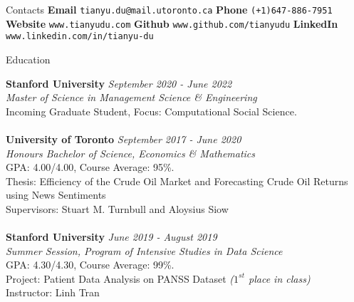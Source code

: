 \documentclass{resume} %
\begin{document}

\begin{rSection}{Contacts}
	\textbf{Email} \texttt{tianyu.du@mail.utoronto.ca}
	\quad
	\textbf{Phone} \texttt{(+1)647-886-7951}
	\quad
	\textbf{Website} \texttt{www.tianyudu.com}
	\quad
	\textbf{Github} \texttt{www.github.com/tianyudu}
	\quad \quad 
	\textbf{LinkedIn} \texttt{www.linkedin.com/in/tianyu-du}
\end{rSection}


\begin{rSection}{Education}

{\bf Stanford University} \hfill {\em September 2020 - June 2022} 
\\ \emph{Master of Science in Management Science \& Engineering}
\\ Incoming Graduate Student, Focus: Computational Social Science.
\\
\\ {\bf University of Toronto} \hfill {\em September 2017 - June 2020} 
\\ \emph{Honours Bachelor of Science, Economics \& Mathematics}
\\ GPA: 4.00/4.00, Course Average: 95\%.
\\ Thesis: Efficiency of the Crude Oil Market and Forecasting Crude Oil Returns using News Sentiments
\\ Supervisors: Stuart M. Turnbull and Aloysius Siow
\\
\\{\bf Stanford University} \hfill {\em June 2019 - August 2019} 
\\ \emph{Summer Session, Program of Intensive Studies in Data Science}
\\ GPA: 4.30/4.30, Course Average: 99\%.
\\ Project: Patient Data Analysis on PANSS Dataset \emph{($1^{st}$ place in class)}
\\ Instructor: Linh Tran
\end{rSection}
\end{document}
